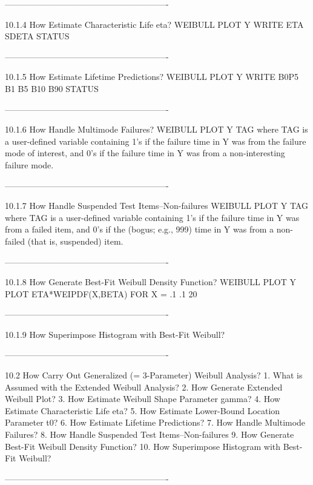 ----------------------------------------------------------
 
10.1.4
How Estimate Characteristic Life eta?
      WEIBULL PLOT Y
      WRITE ETA SDETA
      STATUS
 
----------------------------------------------------------
 
10.1.5
How Estimate Lifetime Predictions?
      WEIBULL PLOT Y
      WRITE B0P5 B1 B5 B10 B90
      STATUS
 
----------------------------------------------------------
 
10.1.6
How Handle Multimode Failures?
      WEIBULL PLOT Y TAG
      where TAG is a user-defined variable containing
      1's if the failure time in Y was from the
      failure mode of interest, and
      0's if the failure time in Y was from a
      non-interesting failure mode.
 
----------------------------------------------------------
 
10.1.7
How Handle Suspended Test Items--Non-failures
      WEIBULL PLOT Y TAG
      where TAG is a user-defined variable containing
      1's if the failure time in Y was from a
      failed item, and
      0's if the (bogus; e.g., 999) time in Y was from a
      non-failed (that is, suspended) item.
 
----------------------------------------------------------
 
10.1.8
How Generate Best-Fit Weibull Density Function?
      WEIBULL PLOT Y
      PLOT ETA*WEIPDF(X,BETA) FOR X = .1 .1 20
 
----------------------------------------------------------
 
10.1.9
How Superimpose Histogram with Best-Fit Weibull?
 
----------------------------------------------------------
 
10.2
How Carry Out Generalized (= 3-Parameter) Weibull Analysis?
   1. What is Assumed with the Extended Weibull Analysis?
   2. How Generate Extended Weibull Plot?
   3. How Estimate Weibull Shape Parameter gamma?
   4. How Estimate Characteristic Life eta?
   5. How Estimate Lower-Bound Location Parameter t0?
   6. How Estimate Lifetime Predictions?
   7. How Handle Multimode Failures?
   8. How Handle Suspended Test Items--Non-failures
   9. How Generate Best-Fit Weibull Density Function?
  10. How Superimpose Histogram with Best-Fit Weibull?
 
----------------------------------------------------------
 
